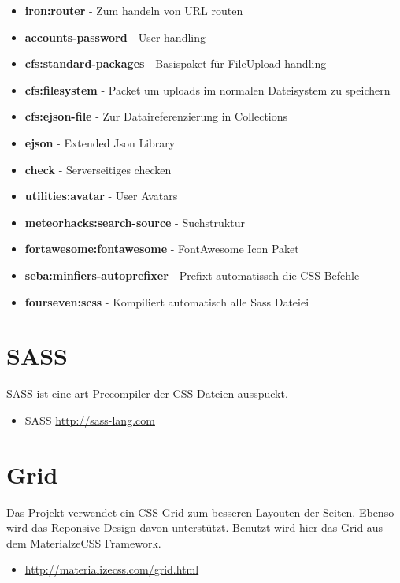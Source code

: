 \documentclass[Info_VK_Website_Dokumentation.tex]{subfiles}
\begin{document}
\begin{itemize}
 	\item \textbf{iron:router} - Zum handeln von URL routen \\
 	\item \textbf{accounts-password} - User handling \\
 	\item \textbf{cfs:standard-packages} - Basispaket für FileUpload handling \\
 	\item \textbf{cfs:filesystem} - Packet um uploads im normalen Dateisystem zu speichern \\
 	\item \textbf{cfs:ejson-file} - Zur Dataireferenzierung in Collections \\
 	\item \textbf{ejson} - Extended Json Library \\
 	\item \textbf{check} - Serverseitiges checken \\
 	\item \textbf{utilities:avatar} - User Avatars \\
 	\item \textbf{meteorhacks:search-source} - Suchstruktur \\
 	\item \textbf{fortawesome:fontawesome} - FontAwesome Icon Paket \\
 	\item \textbf{seba:minfiers-autoprefixer} - Prefixt automatissch die CSS Befehle \\
 	\item \textbf{fourseven:scss} - Kompiliert automatisch alle Sass Dateiei \\
 \end{itemize} 

\section{SASS}

SASS ist eine art Precompiler der CSS Dateien ausspuckt.

\begin{itemize}
	\item SASS \url{http://sass-lang.com} 
\end{itemize}

\section{Grid}

Das Projekt verwendet ein CSS Grid zum besseren Layouten der Seiten. Ebenso wird das Reponsive Design davon unterstützt. Benutzt wird hier das Grid aus dem MaterialzeCSS Framework.

\begin{itemize}
 	\item \url{http://materializecss.com/grid.html} 
\end{itemize} 
\end{document}
